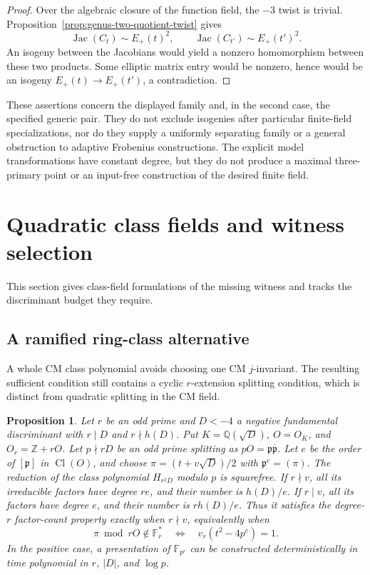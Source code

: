 \documentclass[11pt]{article}
\newtheorem{proposition}[theorem]{Proposition}
\theoremstyle{definition}
\theoremstyle{remark}
\begin{document}
\begin{proof}
Over the algebraic closure of the function field, the \(-3\) twist
is trivial. Proposition~\ref{prop:genus-two-quotient-twist} gives
\[
 \operatorname{Jac}(C_t)\sim E_+(t)^2,\qquad
 \operatorname{Jac}(C_{t'})\sim E_+(t')^2.
\]
An isogeny between the Jacobians would yield a nonzero homomorphism
between these two products. Some elliptic matrix entry would be
nonzero, hence would be an isogeny \(E_+(t)\to E_+(t')\), a
contradiction.
\end{proof}

These assertions concern the displayed family and, in the second
case, the specified generic pair. They do not exclude isogenies
after particular finite-field specializations, nor do they supply
a uniformly separating family or a general obstruction to adaptive
Frobenius constructions. The explicit model transformations have
constant degree, but they do not produce a maximal three-primary
point or an input-free construction of the desired finite field.

\section{Quadratic class fields and witness selection}
This section gives class-field formulations of the missing witness and tracks the discriminant budget they require.

\subsection{A ramified ring-class alternative}

A whole CM class polynomial avoids choosing one CM $j$-invariant.
The resulting sufficient condition still contains a cyclic
$r$-extension splitting condition, which is distinct from quadratic
splitting in the CM field.

\begin{proposition}\label{prop:cm-ring-class-gate}
Let $r$ be an odd prime and $D<-4$ a negative fundamental
discriminant with $r\mid D$ and $r\nmid h(D)$.
Put $K=\mathbb Q(\sqrt D)$, $O=O_K$, and $O_r=\mathbb Z+rO$.
Let $p\nmid rD$ be an odd prime splitting as
$pO=\mathfrak p\overline{\mathfrak p}$.
Let $e$ be the order of $[\mathfrak p]$ in $\operatorname{Cl}(O)$,
and choose $\pi=(t+v\sqrt D)/2$ with
$\mathfrak p^e=(\pi)$.
The reduction of the class polynomial $H_{r^2D}$ modulo $p$ is
squarefree.  If $r\nmid v$, all its irreducible factors have degree
$re$, and their number is $h(D)/e$.
If $r\mid v$, all its factors have degree $e$, and their number is
$r h(D)/e$.
Thus it satisfies the degree-$r$ factor-count property exactly
when $r\nmid v$, equivalently when
\[
 \pi\bmod rO\notin\mathbb F_r^*
 \quad\Longleftrightarrow\quad
 v_r(t^2-4p^e)=1.
\]
In the positive case, a presentation of $\mathbb F_{p^r}$ can be
constructed deterministically in time polynomial in $r$, $|D|$,
and $\log p$.
\end{proposition}
\end{document}
